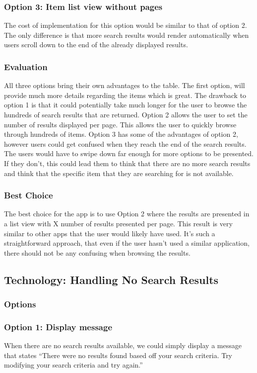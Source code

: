 \documentclass[journal,compsoc, 10pt, draftclsnofoot, onecolumn]{IEEEtran}
\begin{document}
\subsubsection*{Option 3: Item list view without pages}
The cost of implementation for this option would be similar to that of option 2. 
The only difference is that more search results would render automatically when 
users scroll down to the end of the already displayed results. 

\subsubsection{Evaluation}
All three options bring their own advantages to the table. The first option, will 
provide much more details regarding the items which is great. The drawback to 
option 1 is that it could potentially take much longer for the user to browse the 
hundreds of search results that are returned. Option 2 allows the user to set the 
number of results displayed per page. This allows the user to quickly browse through 
hundreds of items. Option 3 has some of the advantages of option 2, however users 
could get confused when they reach the end of the search results. The users would 
have to swipe down far enough for more options to be presented. If they don't, this 
could lead them to think that there are no more search results and think that the 
specific item that they are searching for is not available. 
\subsubsection{Best Choice}
The best choice for the app is to use Option 2 where the results are presented in 
a list view with X number of results presented per page. This result is very 
similar to other apps that the user would likely have used. It's such a 
straightforward approach, that even if the user hasn't used a similar 
application, there should not be any confusing when browsing the results. 

\subsection{Technology: Handling No Search Results}
\subsubsection{Options}

\subsubsection*{Option 1: Display message}
When there are no search results available, we could simply display a message 
that states ``There were no results found based off your search criteria. Try 
modifying your search criteria and try again.''
\end{document}
